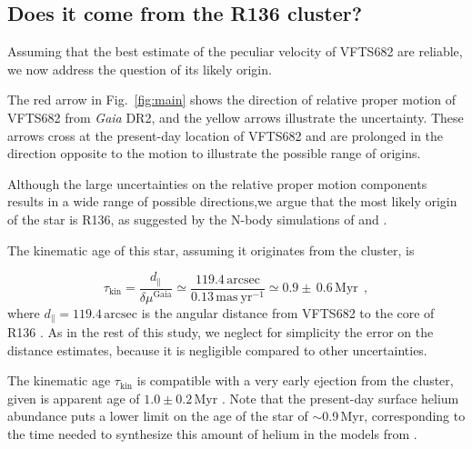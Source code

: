 \documentclass[a4paper,fleqn,usenatbib]{mnras}
\newcommand{\todo}[1]{{\large $\blacksquare$~\textbf{\color{red}[#1]}}~$\blacksquare$}
\DeclareRobustCommand{\Eqref}[1]{Eq.~\ref{#1}}
\DeclareRobustCommand{\Figref}[1]{Fig.~\ref{#1}}
\begin{document}
\subsection{Does it come from the R136 cluster?}
\label{sec:r136_origin}

Assuming that the best estimate of the peculiar velocity of VFTS682
are reliable, we now address the question of its likely origin.

The red arrow in \Figref{fig:main} shows the direction of relative proper motion of
VFTS682 from \emph{Gaia} DR2, and the
yellow arrows illustrate the uncertainty. %
These arrows cross at the present-day location of VFTS682 and
are prolonged in the direction opposite to the motion to illustrate
the possible range of origins. %

Although the large uncertainties on the relative proper motion
components results in a wide range of possible directions,we argue that the most likely origin of the star is R136,
as suggested by the N-body simulations of \cite{fujii:11}
and \cite{banerjee:12}.

The kinematic age of this star, assuming it originates from the
cluster, is

\begin{equation}
  \label{eq:kin_age}
  \tau_\mathrm{kin} = \frac{d_\parallel}{\delta\mu^\mathrm{Gaia}} \simeq
  \frac{119.4\,\mathrm{arcsec}}{0.13\,\mathrm{mas\ yr^{-1}}} \simeq 0.9\pm\,0.6\, \mathrm{Myr} \ \ ,
\end{equation}
where $d_\parallel = 119.4\,\mathrm{arcsec}$ is the angular distance from VFTS682 to
the core of R136 \citep[corresponding to $\sim$29\,pc at LMC distance,][]{bestenlehner:11}.
As in the rest of this study, we neglect for
simplicity the error on the distance estimates, because it is negligible compared to other uncertainties.

The kinematic age $\tau_\mathrm{kin}$ is compatible with a very early
ejection from the cluster, given is apparent age
of $1.0\pm 0.2$\,Myr \citep{schneider:18}. %
Note that the
present-day surface helium abundance
\citep[$Y\simeq0.5$,][]{bestenlehner:11, rubio-diez:17} puts a lower
limit on the age of the star of $\sim$0.9\,Myr, corresponding to the time needed to
synthesize this amount of helium in the models from \cite{kohler:15}.
\end{document}
